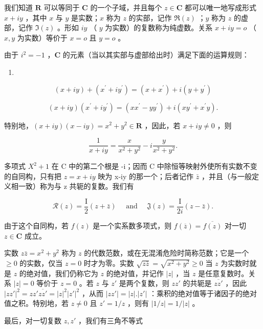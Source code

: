 我们知道 \(\mathbf{R}\) 可以等同于 \(\mathbf{C}\) 的一个子域，并且每个 \(z \in \mathbf{C}\) 都可以唯一地写成形式 \(x + iy\) ，其中 \(x\) 与 \(y\) 是实数；\(x\) 称为 \(z\) 的实部，记作 \(\Re(z)\) ；\(y\) 称为 \(z\) 的虚部，记作 \(\Im(z)\) 。形如 \(iy\) （ \(y\) 为实数）的复数称为纯虚数。关系 \(x + iy = o\) （ \(x, y\) 为实数）等价于 \(x = o\) 且 \(y = o\) 。

由于 \(i^2 = -1\) ，\(\mathbf{C}\) 的元素（当以其实部与虚部给出时）满足下面的运算规则：

\begin{enumerate}
\def\labelenumi{(\arabic{enumi})}
\tightlist
\item
\end{enumerate}

\[
(x + i y) + (x ^ {\prime} + i y ^ {\prime}) = (x + x ^ {\prime}) + i (y + y ^ {\prime})\tag{2}
\]

\[
(x + i y) (x ^ {\prime} + i y ^ {\prime}) = (x x ^ {\prime} - y y ^ {\prime}) + i (x y ^ {\prime} + x ^ {\prime} y).
\]

特别地，\((x + iy)(x - iy) = x^{2} + y^{2}\in \mathbf{R}\) ，因此，若 \(x + iy\neq 0\) ，则

\[
\frac {1}{x + i y} = \frac {x}{x ^ {2} + y ^ {2}} - i \frac {y}{x ^ {2} + y ^ {2}}.\tag{3}
\]

多项式 \(X^{2}+1\) 在 C 中的第二个根是 -i；因而 C 中除恒等映射外使所有实数不变的自同构，只有把 \(z=x+iy\) 映为 x-iy 的那一个；后者记作 \(\bar{z}\) ，并且（与一般定义相一致）称为与 z 共轭的复数。我们有

\[
\mathcal {R} (z) = \frac {\mathrm{I}}{2} (z + \bar {z}) \quad \text { and } \quad \mathfrak {J} (z) = \frac {\mathrm{I}}{2 i} (z - \bar {z}).
\]

由于这个自同构，若 \(f(z)\) 是一个实系数多项式，则 \(f(\overline{z}) = \overline{f(z)}\) 对一切 \(z \in \mathbf{C}\) 成立。

实数 \(z\bar{z} = x^2 + y^2\) 称为 \(z\) 的代数范数，或在无混淆危险时简称范数；它是一个 \(\geqslant 0\) 的实数，仅当 \(z = 0\) 时才为零。实数 \(\sqrt{z\bar{z}} = \sqrt{x^2 + y^2} \geqslant 0\) 当 \(z\) 为实数时就是 \(z\) 的绝对值，我们仍称它为 \(z\) 的绝对值，并记作 \(|z|\) ，当 \(z\) 是任意复数时。关系 \(|z| = 0\) 等价于 \(z = 0\) 。若 \(z\) 与 \(z'\) 是两个复数，则 \(zz'\) 的共轭是 \(\overline{zz'}\) ，因此 \(|zz'|^2 = zz' \overline{zz'} = |z|^2 |z'|^2\) ，从而 \(|zz'| = |z|. |z'|\) ：乘积的绝对值等于诸因子的绝对值之积。特别地，若 \(z \neq 0\) 且 \(z' = 1/z\) ，则有 \(|1/z| = 1/|z|\) 。

最后，对一切复数 \(z, z'\) ，我们有三角不等式


